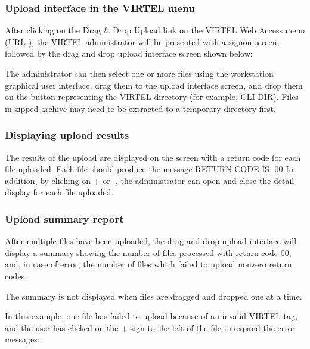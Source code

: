 \documentclass[letterpaper,10pt,english]{sphinxmanual}
\begin{document}
\subsubsection{Upload interface in the VIRTEL menu}
\label{\detokenize{audit_operations_ and_performance:upload-interface-in-the-virtel-menu}}
After clicking on the Drag \& Drop Upload link on the VIRTEL Web Access menu (URL ), the VIRTEL administrator will be presented with a signon screen, followed by the drag and drop upload interface screen shown below:



The administrator can then select one or more files using the workstation graphical user interface, drag them to the upload interface screen, and drop them on the button representing the VIRTEL directory (for example, CLI-DIR). Files in zipped archive may need to be extracted to a temporary directory first.


\subsubsection{Displaying upload results}
\label{\detokenize{audit_operations_ and_performance:displaying-upload-results}}


The results of the upload are displayed on the screen with a return code for each file uploaded. Each file should produce the message RETURN CODE IS: 00 In addition, by clicking on + or -, the administrator can open and close the detail display for each file uploaded.


\subsubsection{Upload summary report}
\label{\detokenize{audit_operations_ and_performance:upload-summary-report}}
After multiple files have been uploaded, the drag and drop upload interface will display a summary showing the number of files processed with return code 00, and, in case of error, the number of files which failed to upload nonzero return codes.

The summary is not displayed when files are dragged and dropped one at a time.

In this example, one file has failed to upload because of an invalid VIRTEL tag, and the user has clicked on the + sign to the left of the file to expand the error messages:
\end{document}
